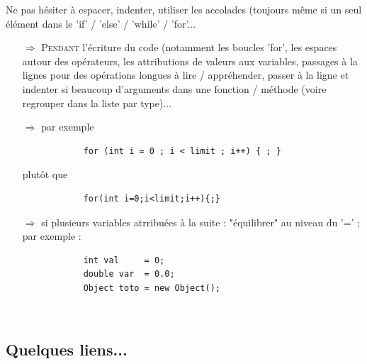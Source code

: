 \documentclass[11pt,twoside,a4paper]{article}
\begin{document}
Ne pas h{\'e}siter {\`a} espacer, indenter, utiliser les accolades (toujours m{\^e}me si un seul {\'e}l{\'e}ment dans le 'if' / 'else' / 'while' / 'for'... 
\begin{itemize}
	\item[$\Rightarrow$] \textsc{Pendant} l'{\'e}criture du code (notamment les boucles 'for', les espaces autour des op{\'e}rateurs, les attributions de valeurs aux variables, passages {\`a} la lignes pour des op{\'e}rations longues {\`a} lire / appr{\'e}hender, passer {\`a} la ligne et indenter si beaucoup d'arguments dans une fonction / m{\'e}thode (voire regrouper dans la liste par type)...
	\item[$\Rightarrow$] par exemple 
		\begin{verbatim}
            for (int i = 0 ; i < limit ; i++) { ; }
		\end{verbatim}
		plut{\^o}t que
		\begin{verbatim}
            for(int i=0;i<limit;i++){;}
		\end{verbatim}
	\item[$\Rightarrow$] si plusieurs variables atrribu{\'e}es {\`a} la suite : "{\'e}quilibrer" au niveau du '=' ; par exemple : 
	\begin{verbatim}
            int val     = 0;
            double var  = 0.0;
            Object toto = new Object();
	\end{verbatim}
\end{itemize}~\\

\clearpage
	
\subsection{Quelques liens...}
\end{document}
